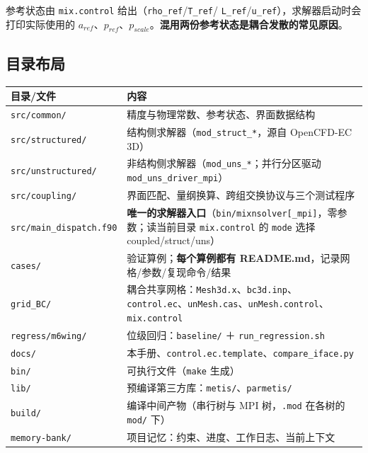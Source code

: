 \documentclass[11pt,a4paper]{ctexart}
\begin{document}
参考状态由 \texttt{mix.control} 给出（\texttt{rho\_ref}/\texttt{T\_ref}/
\texttt{L\_ref}/\texttt{u\_ref}），求解器启动时会打印实际使用的
$a_{ref}$、$p_{ref}$、$p_{scale}$。\textbf{混用两份参考状态是耦合发散的常见原因}。

\subsection{目录布局}

\begin{center}\small
\begin{tabular}{@{}>{\raggedright\arraybackslash}p{}>{\raggedright\arraybackslash}p{}@{}}
\toprule
目录/文件 & 内容 \\
\midrule
\texttt{src/common/} & 精度与物理常数、参考状态、界面数据结构 \\
\texttt{src/structured/} & 结构侧求解器（\texttt{mod\_struct\_*}，源自 OpenCFD-EC 3D） \\
\texttt{src/unstructured/} & 非结构侧求解器（\texttt{mod\_uns\_*}；并行分区驱动 \texttt{mod\_uns\_driver\_mpi}） \\
\texttt{src/coupling/} & 界面匹配、量纲换算、跨组交换协议与三个测试程序 \\
\texttt{src/main\_dispatch.f90} & \textbf{唯一的求解器入口}（\texttt{bin/mixnsolver[\_mpi]}，零参数；读当前目录 \texttt{mix.control} 的 \texttt{mode} 选择 coupled/struct/uns） \\
\texttt{cases/} & 验证算例；\textbf{每个算例都有 README.md}，记录网格/参数/复现命令/结果 \\
\texttt{grid\_BC/} & 耦合共享网格：\texttt{Mesh3d.x}、\texttt{bc3d.inp}、\texttt{control.ec}、\texttt{unMesh.cas}、\texttt{unMesh.control}、\texttt{mix.control} \\
\texttt{regress/m6wing/} & 位级回归：\texttt{baseline/} ＋ \texttt{run\_regression.sh} \\
\texttt{docs/} & 本手册、\texttt{control.ec.template}、\texttt{compare\_iface.py} \\
\texttt{bin/} & 可执行文件（\texttt{make} 生成） \\
\texttt{lib/} & 预编译第三方库：\texttt{metis/}、\texttt{parmetis/} \\
\texttt{build/} & 编译中间产物（串行树与 MPI 树，\texttt{.mod} 在各树的 \texttt{mod/} 下） \\
\texttt{memory-bank/} & 项目记忆：约束、进度、工作日志、当前上下文 \\
\bottomrule
\end{tabular}
\end{center}
\end{document}
